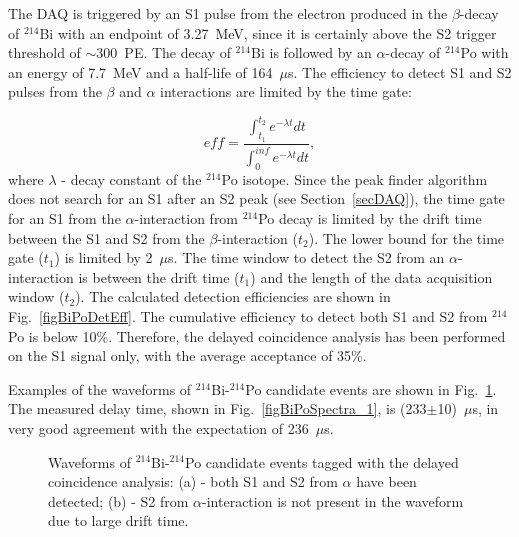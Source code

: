 The DAQ is triggered by an S1 pulse from the electron produced in the $\beta$-decay of $^{214}$Bi with an endpoint of 3.27~MeV, since it is certainly above the S2 trigger threshold of $\sim$300~PE. 
The decay of $^{214}$Bi is followed by an $\alpha$-decay of $^{214}$Po with an energy of 7.7~MeV and a half-life of 164~$\mu$s. 
The efficiency to detect S1 and S2 pulses from the $\beta$ and $\alpha$ interactions are limited by the time gate:

\begin{equation}
\label{eqDetectionEfficiency}
eff = \frac{\int_{t_{1}}^{t_{2}}e^{-\lambda t}dt  }{ \int_{0}^{inf}e^{-\lambda t}dt },
\end{equation}
where $\lambda$ - decay constant of the $^{214}$Po isotope.
Since the peak finder algorithm does not search for an S1 after an S2 peak (see Section~\ref{secDAQ}), the time gate for an S1 from the $\alpha$-interaction from $^{214}$Po decay is limited by the drift time between the S1 and S2 from the $\beta$-interaction ($t_{2}$). The lower bound for the time gate ($t_{1}$) is limited by 2~$\mu$s. The time window to detect the S2 from an $\alpha$-interaction is between the drift time ($t_{1}$) and the length of the data acquisition window ($t_{2}$). 
The calculated detection efficiencies are shown in Fig.~\ref{figBiPoDetEff}. The cumulative efficiency to detect both S1 and S2 from $^{214}$Po is below 10\%. Therefore, the delayed coincidence analysis has been performed on the S1 signal only, with the average acceptance of 35\%.

Examples of the waveforms of $^{214}$Bi-$^{214}$Po candidate events are shown in Fig.~\ref{figBiPoWF}. The measured delay time, shown in Fig.~\ref{figBiPoSpectra_1}, is (233$\pm$10)~$\mu$s, in very good agreement with the expectation of 236~$\mu$s.

\begin{figure}[!b]
\centering
{}
\caption[Waveforms of $^{214}$Bi-$^{214}$Po candidate events tagged with the delayed coincidence analysis]{Waveforms of $^{214}$Bi-$^{214}$Po candidate events tagged with the delayed coincidence analysis: (a) - both S1 and S2 from $\alpha$ have been detected; (b) - S2 from $\alpha$-interaction is not present in the waveform due to large drift time.}
\label{figBiPoWF}
\end{figure}

